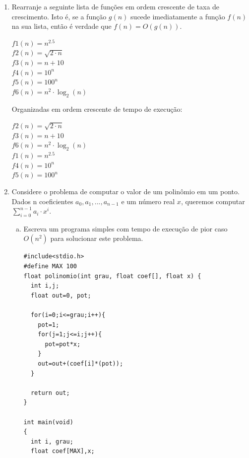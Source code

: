 \documentclass[a4paper,10pt]{article}
\begin{document}
\begin{enumerate}
\item Rearranje a seguinte lista de funções em ordem crescente de taxa de crescimento. Isto é,
se a função $g(n)$ sucede imediatamente a função $f(n)$ na sua lista, então é verdade que $f(n) = O(g(n))$.


\begin{center}

$f1(n) = n^{2.5}$ \\
$f2(n) = \sqrt{2\cdot n}$ \\
$f3(n) = n + 10$ \\
$f4(n) = 10^n$ \\
$f5(n) = 100^n$ \\
$f6(n) = n^2 \cdot \log_2(n)$ \\

\end{center}

\begin{center}

Organizadas em ordem crescente de tempo de execução:

$f2(n) = \sqrt{2\cdot n}$ \\
$f3(n) = n + 10$ \\
$f6(n) = n^2 \cdot \log_2(n)$ \\
$f1(n) = n^{2.5}$ \\
$f4(n) = 10^n$ \\
$f5(n) = 100^n$ \\

\end{center}
\pagebreak

\item Considere o problema de computar o valor de um polinômio em um ponto. 
Dados n coeficientes $a_0 , a_1 , . . . , a_{n-1}$ e um número real $x$, 
queremos computar $\sum\limits_{i=0}^{n-1} a_i \cdot x^i$.
  
  \begin{enumerate}[(a)]
\item Escreva um programa simples com tempo de execução de pior caso $O(n^2)$ para solucionar este problema.

\begin{lstlisting}
#include<stdio.h>
#define MAX 100
float polinomio(int grau, float coef[], float x) {
  int i,j;
  float out=0, pot;

  for(i=0;i<=grau;i++){
    pot=1;
    for(j=1;j<=i;j++){
      pot=pot*x;
    }
    out=out+(coef[i]*(pot));
  }

  return out;
}

int main(void)
{
  int i, grau;
  float coef[MAX],x;


\end{lstlisting}
\end{enumerate}
\end{enumerate}
\end{document}
